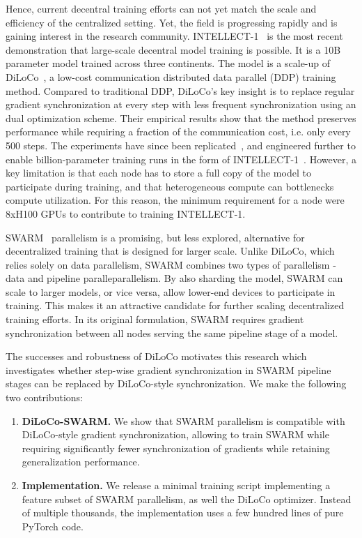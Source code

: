 \documentclass{article}
\begin{document}
Hence, current decentral training efforts can not yet match the scale and
efficiency of the centralized setting. Yet, the field is progressing rapidly and
is gaining interest in the research community.
INTELLECT-1~\cite{jaghouar2024intellect1} is the most recent demonstration that
large-scale decentral model training is possible. It is a 10B parameter model
trained across three continents. The model is a scale-up of
DiLoCo~\cite{douillard2023diloco}, a low-cost communication distributed data
parallel (DDP) training method. Compared to traditional DDP, DiLoCo's key
insight is to replace regular gradient synchronization at every step with less
frequent synchronization using an dual optimization scheme. Their empirical
results show that the method preserves performance while requiring a fraction of
the communication cost, i.e. only every 500 steps. The experiments have since
been replicated~\cite{jaghouar2024opendiloco}, and engineered further to enable
billion-parameter training runs in the form of
INTELLECT-1~\cite{jaghouar2024intellect1}.  However, a key limitation is that
each node has to store a full copy of the model to participate during training,
and that heterogeneous compute can bottlenecks compute utilization. For this
reason, the minimum requirement for a node were 8xH100 GPUs to contribute to
training INTELLECT-1.

SWARM~\cite{ryabinin2023swarm} parallelism is a promising, but less explored,
alternative for decentralized training that is designed for larger scale. Unlike
DiLoCo, which relies solely on data parallelism, SWARM combines two types of 
parallelism - data and pipeline paralleparallelism. By also sharding the model,
SWARM can scale to larger models, or vice versa, allow lower-end devices to
participate in training. This makes it an attractive candidate for further
scaling decentralized training efforts. In its original formulation, SWARM
requires gradient synchronization between all nodes serving the same pipeline
stage of a model. 

The successes and robustness of DiLoCo motivates this research which
investigates whether step-wise gradient synchronization in SWARM pipeline stages
can be replaced by DiLoCo-style synchronization. We make the following two
contributions:

\begin{enumerate}
  \item \textbf{DiLoCo-SWARM.} We show that SWARM parallelism is compatible with
  DiLoCo-style gradient synchronization, allowing to train SWARM while requiring
  significantly fewer synchronization of gradients while retaining
  generalization performance.
  \item \textbf{Implementation.} We release a minimal training script
  implementing a feature subset of SWARM parallelism, as well the DiLoCo
  optimizer.  Instead of multiple thousands, the implementation uses a few
  hundred lines of pure PyTorch code.
\end{enumerate}
\end{document}
